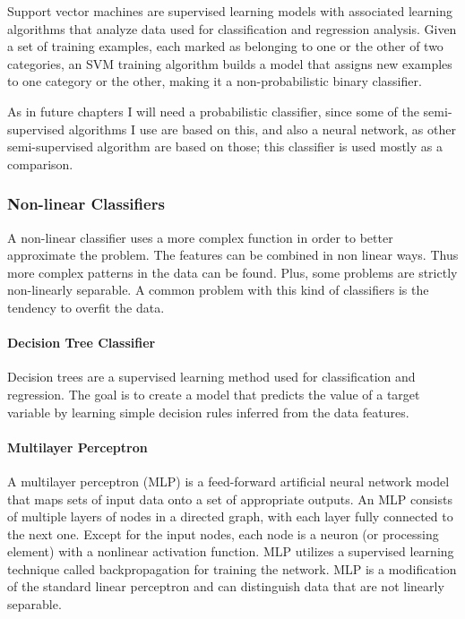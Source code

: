 Support vector machines \cite{Cortes1995} are supervised learning models with
associated learning algorithms that analyze data used for classification and
regression analysis. Given a set of training examples, each marked as belonging
to one or the other of two categories, an SVM training algorithm builds a model
that assigns new examples to one category or the other, making it a
non-probabilistic binary classifier.

As in future chapters I will need a probabilistic classifier, since
some of the semi-supervised algorithms I use are based on this, and also a
neural network, as other semi-supervised algorithm are based on those; this
classifier is used mostly as a comparison.

\subsubsection{Non-linear Classifiers}

A non-linear classifier uses a more complex function in order to better
approximate the problem. The features can be combined in non linear ways. Thus
more complex patterns in the data can be found. Plus, some problems are
strictly non-linearly separable. A common problem with this kind of
classifiers is the tendency to overfit the data.

\paragraph{Decision Tree Classifier}

Decision trees \cite{quinlan1986induction} are a supervised learning method
used for classification and regression. The goal is to create a model that
predicts the value of a target variable by learning simple decision rules
inferred from the data features.

\paragraph{Multilayer Perceptron}

A multilayer perceptron (MLP) \cite{rosenblatt1962principles} is a feed-forward
artificial neural network model that maps sets of input data onto a set of
appropriate outputs. An MLP consists of multiple layers of nodes in a directed
graph, with each layer fully connected to the next one. Except for the input
nodes, each node is a neuron (or processing element) with a nonlinear
activation function. MLP utilizes a supervised learning technique called
backpropagation for training the network. MLP is a modification of the standard
linear perceptron and can distinguish data that are not linearly separable.

